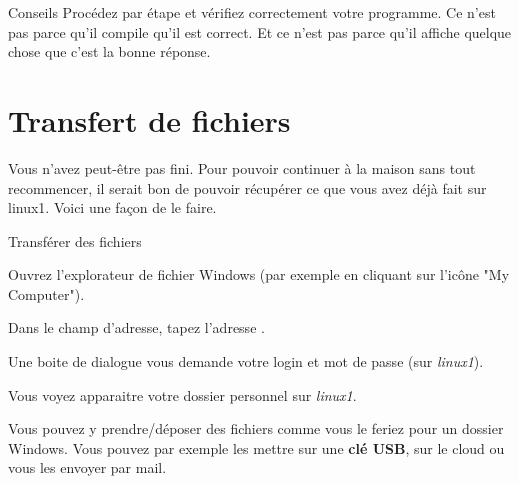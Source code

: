 \documentclass[a4paper,11pt]{style-esi/td}
\begin{document}
	\begin{alerttbox}{Conseils}
		Procédez par étape et vérifiez correctement votre programme.
		Ce n'est pas parce qu'il compile qu'il est correct.
		Et ce n'est pas parce qu'il affiche quelque chose que c'est la bonne réponse.
	\end{alerttbox}

\section{Transfert de fichiers}  

	Vous n'avez peut-être pas fini. Pour pouvoir continuer à la maison sans tout recommencer, 
    il serait bon de pouvoir récupérer ce que vous avez déjà fait sur linux1.
	Voici une façon de le faire.			
				
	\begin{Tutoriel}{Transférer des fichiers}
	\begin{steps}		
		\item 
			Ouvrez l'explorateur de fichier Windows (par exemple en cliquant sur l'icône "My Computer").
		\item 
			Dans le champ d'adresse, tapez l'adresse .
		\item 
			Une boite de dialogue vous demande votre login et mot de passe (sur \textit{linux1}).
		\item 
			Vous voyez apparaitre votre dossier personnel sur \textit{linux1}. 
		\item 
			Vous pouvez y prendre/déposer des fichiers comme vous le feriez pour un dossier Windows. 
			Vous pouvez par exemple les mettre sur une \textbf{clé USB},
			sur le cloud ou vous les envoyer par mail.
	\end{steps}
	\end{Tutoriel}			
							
\end{document}
